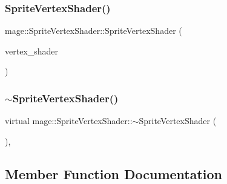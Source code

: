 \hypertarget{classmage_1_1_sprite_vertex_shader_afb8c1866f6ffdb0fdcd1017591b8c832}{}\label{classmage_1_1_sprite_vertex_shader_afb8c1866f6ffdb0fdcd1017591b8c832} 
\subsubsection{\texorpdfstring{Sprite\+Vertex\+Shader()}{SpriteVertexShader()}\hspace{0.1cm}{\footnotesize\ttfamily [3/3]}}
{\footnotesize\ttfamily mage\+::\+Sprite\+Vertex\+Shader\+::\+Sprite\+Vertex\+Shader (\begin{DoxyParamCaption}\item[{\hyperlink{classmage_1_1_sprite_vertex_shader}{Sprite\+Vertex\+Shader} \&\&}]{vertex\+\_\+shader }\end{DoxyParamCaption})\hspace{0.3cm}{\ttfamily [default]}}

\hypertarget{classmage_1_1_sprite_vertex_shader_a8bed9663e8aac773ed31c58ca6e0d98f}{}\label{classmage_1_1_sprite_vertex_shader_a8bed9663e8aac773ed31c58ca6e0d98f} 
\subsubsection{\texorpdfstring{$\sim$\+Sprite\+Vertex\+Shader()}{~SpriteVertexShader()}}
{\footnotesize\ttfamily virtual mage\+::\+Sprite\+Vertex\+Shader\+::$\sim$\+Sprite\+Vertex\+Shader (\begin{DoxyParamCaption}{ }\end{DoxyParamCaption})\hspace{0.3cm}{\ttfamily [virtual]}, {\ttfamily [default]}}



\subsection{Member Function Documentation}
\hypertarget{classmage_1_1_sprite_vertex_shader_a4400ddda9637b280b7c8aedeeec6e4e7}{}\label{classmage_1_1_sprite_vertex_shader_a4400ddda9637b280b7c8aedeeec6e4e7} 
